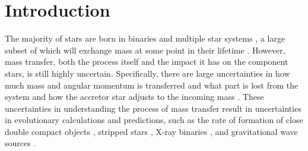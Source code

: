 \documentclass[desactivate]{aa}
\begin{document}

\maketitle


\section{Introduction} \label{sec:intro}

The majority of stars are born in binaries and multiple star systems \citep[e.g.][]{Duchene+2013:2013ARA&A..51..269D,Moe+2017,Offner+2023:2023ASPC..534..275O}, a large subset of which will exchange mass at some point in their lifetime \citep[e.g][]{Podsiadlowski+1992:1992ApJ...391..246P,Sana+2012,deMink+2014}. However, mass transfer, both the process itself and the impact it has on the component stars, is still highly uncertain. Specifically, there are large uncertainties in how much mass and angular momentum is transferred and what part is lost from the system \citep{Packet+1981,deMink+2007:2007A&A...467.1181D,Renzo+2021} and how the accretor star adjusts to the incoming mass \citep{Hellings1983,Braun+1995,Cantiello+2007,Staritsin+2019,Renzo+2023,Lau+2024:2024arXiv240109570L}. These uncertainties in understanding the process of mass transfer result in uncertainties in evolutionary calculations and predictions, such as the rate of formation of close double compact objects \citep{Toonen+2013,Marchant2021+, vanSon+2022:2022ApJ...940..184V}, stripped stars \citep{Crowther2007,Heber2016,Gotberg+2020}, X-ray binaries \citep{Fragos+2013:2013ApJ...764...41F}, and gravitational wave sources \citep[e.g.][]{Dominik+2015:2015ApJ...806..263D,Belczynski+2002:2002ApJ...572..407B,Broekgaarden+2022,Iorio+2023}.
\end{document}
